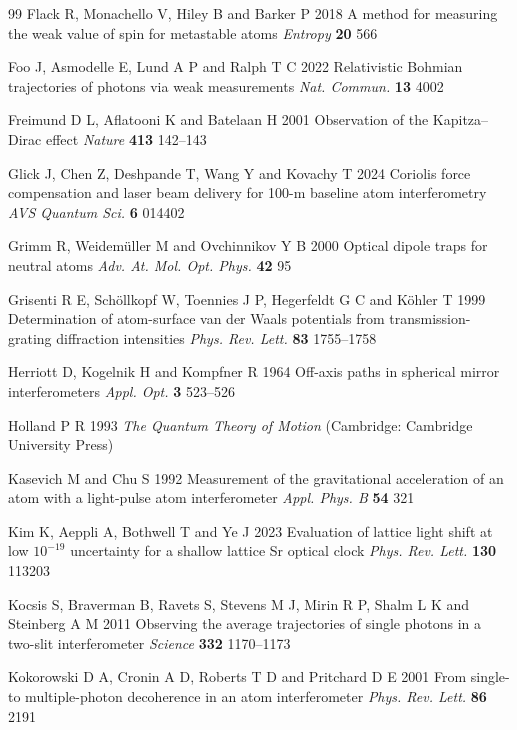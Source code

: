 \documentclass[11pt,a4paper]{article}
\begin{document}
\begin{thebibliography}{99}
Flack R, Monachello V, Hiley B and Barker P 2018 A method for measuring the weak value of spin for metastable atoms \textit{Entropy} \textbf{20} 566

Foo J, Asmodelle E, Lund A P and Ralph T C 2022 Relativistic Bohmian trajectories of photons via weak measurements \textit{Nat. Commun.} \textbf{13} 4002

Freimund D L, Aflatooni K and Batelaan H 2001 Observation of the Kapitza--Dirac effect \textit{Nature} \textbf{413} 142--143

Glick J, Chen Z, Deshpande T, Wang Y and Kovachy T 2024 Coriolis force compensation and laser beam delivery for 100-m baseline atom interferometry \textit{AVS Quantum Sci.} \textbf{6} 014402

Grimm R, Weidem\"uller M and Ovchinnikov Y B 2000 Optical dipole traps for neutral atoms \textit{Adv. At. Mol. Opt. Phys.} \textbf{42} 95

Grisenti R E, Sch\"ollkopf W, Toennies J P, Hegerfeldt G C and K\"ohler T 1999 Determination of atom-surface van der Waals potentials from transmission-grating diffraction intensities \textit{Phys. Rev. Lett.} \textbf{83} 1755--1758

Herriott D, Kogelnik H and Kompfner R 1964 Off-axis paths in spherical mirror interferometers \textit{Appl. Opt.} \textbf{3} 523--526

Holland P R 1993 \textit{The Quantum Theory of Motion} (Cambridge: Cambridge University Press)

Kasevich M and Chu S 1992 Measurement of the gravitational acceleration of an atom with a light-pulse atom interferometer \textit{Appl. Phys. B} \textbf{54} 321

Kim K, Aeppli A, Bothwell T and Ye J 2023 Evaluation of lattice light shift at low $10^{-19}$ uncertainty for a shallow lattice Sr optical clock \textit{Phys. Rev. Lett.} \textbf{130} 113203

Kocsis S, Braverman B, Ravets S, Stevens M J, Mirin R P, Shalm L K and Steinberg A M 2011 Observing the average trajectories of single photons in a two-slit interferometer \textit{Science} \textbf{332} 1170--1173

Kokorowski D A, Cronin A D, Roberts T D and Pritchard D E 2001 From single- to multiple-photon decoherence in an atom interferometer \textit{Phys. Rev. Lett.} \textbf{86} 2191


\end{thebibliography}
\end{document}
